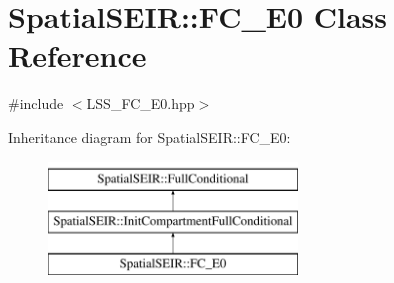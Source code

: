 \hypertarget{classSpatialSEIR_1_1FC__E0}{\section{Spatial\-S\-E\-I\-R\-:\-:F\-C\-\_\-\-E0 Class Reference}
\label{classSpatialSEIR_1_1FC__E0}
}


{\ttfamily \#include $<$L\-S\-S\-\_\-\-F\-C\-\_\-\-E0.\-hpp$>$}

Inheritance diagram for Spatial\-S\-E\-I\-R\-:\-:F\-C\-\_\-\-E0\-:\begin{figure}[H]
\begin{center}
\leavevmode
\includegraphics[height=3.000000cm]{classSpatialSEIR_1_1FC__E0}
\end{center}
\end{figure}
